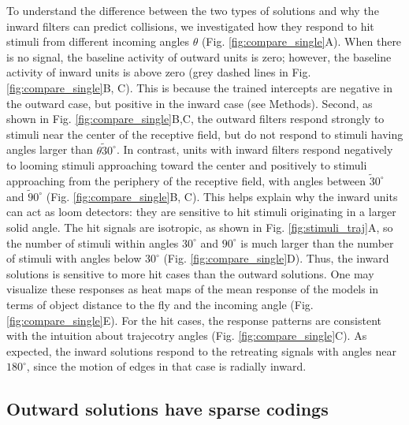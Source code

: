 \documentclass[pdftex,9pt,lineno]{elife}
\begin{document}
To understand the difference between the two types of solutions and why the inward filters can predict collisions, we investigated how they respond to hit stimuli from different incoming angles $\theta$ (Fig. \ref{fig:compare_single}A). When there is no signal, the baseline activity of outward units is zero; however, the baseline activity of inward units is above zero (grey dashed lines in Fig. \ref{fig:compare_single}B, C). This is because the trained intercepts are negative in the outward case, but positive in the inward case (see Methods). Second, as shown in Fig. \ref{fig:compare_single}B,C, the outward filters respond strongly to stimuli near the center of the receptive field, but do not respond to stimuli having angles larger than $\theta \tilde 30^{\circ}$. In contrast, units with inward filters respond negatively to looming stimuli approaching toward the center and positively to stimuli approaching from the periphery of the receptive field, with angles between $\tilde 30^{\circ}$ and $\tilde 90^{\circ}$ (Fig. \ref{fig:compare_single}B, C). This helps explain why the inward units can act as loom detectors: they are sensitive to hit stimuli originating in a larger solid angle. The hit signals are isotropic, as shown in Fig. \ref{fig:stimuli_traj}A, so the number of stimuli within angles $30^{\circ}$ and $90^{\circ}$ is much larger than the number of stimuli with angles below $30^{\circ}$ (Fig. \ref{fig:compare_single}D). Thus, the inward solutions is sensitive to more hit cases than the outward solutions. One may visualize these responses as heat maps of the mean response of the models in terms of object distance to the fly and the incoming angle (Fig. \ref{fig:compare_single}E). For the hit cases, the response patterns are consistent with the intuition about trajecotry angles (Fig. \ref{fig:compare_single}C). As expected, the inward solutions respond to the retreating signals with angles near $180^{\circ}$, since the motion of edges in that case is radially inward.

\subsection{Outward solutions have sparse codings}


\end{document}
